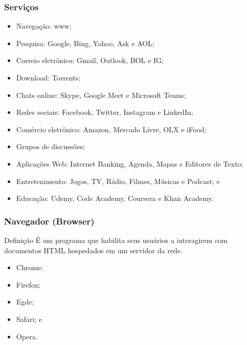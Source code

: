 \documentclass[aspectratio=169]{beamer} %
\begin{document}
\begin{frame}
	\frametitle{Servi\c cos}
			
	\begin{itemize}
		\item Navegação: www;
		\item Pesquisa: Google, Bing, Yahoo, Ask e AOL;	
		\item Correio eletrônico: Gmail, Outlook, BOL e IG;
		\item Download: Torrents;
		\item Chats online: Skype, Google Meet e Microsoft Teams;
		\item Redes sociais: Facebook, Twitter, Instagram e LinkedIn;
		\item Comércio eletrônico: Amazon, Mercado Livre, OLX e iFood;
		\item Grupos de discussões;
		\item Aplicações Web: Internet Banking, Agenda, Mapas e Editores de Texto;
		\item Entretenimento: Jogos, TV, Rádio, Filmes, Músicas e Podcast; e
		\item Educa\c cão: Udemy, Code Academy, Coursera e Khan Academy.
	\end{itemize}
\end{frame}

\begin{frame}
	\frametitle{Navegador (Browser)}
	
	\begin{block}{Defini\c cão}
		É um programa que habilita seus usuários a interagirem com documentos HTML hospedados em um servidor da rede.
	\end{block} \vfill
		
	\begin{itemize}
		\item Chrome;
		\item Firefox;
		\item Egde;
		\item Safari; e
		\item Opera.
	\end{itemize}
\end{frame}
\end{document}
